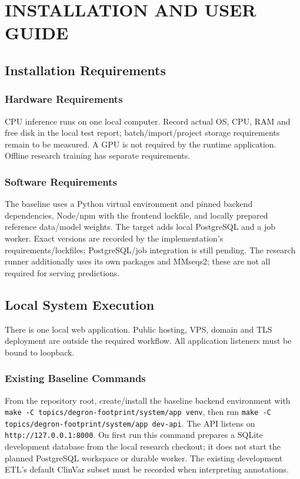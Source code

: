 \chapter{INSTALLATION AND USER GUIDE}\label{app:installation}

\section{Installation Requirements}
\subsection{Hardware Requirements}
CPU inference runs on one local computer. Record actual OS, CPU, RAM and free disk in the local test
report; batch/import/project storage requirements remain to be measured. A GPU is not required by the
runtime application. Offline research training has separate requirements.
\subsection{Software Requirements}
The baseline uses a Python virtual environment and pinned backend dependencies, Node/npm with the
frontend lockfile, and locally prepared reference data/model weights. The target adds local PostgreSQL
and a job worker. Exact versions are recorded by the implementation's requirements/lockfiles;
PostgreSQL/job integration is still pending. The research runner additionally uses its own packages
and MMseqs2; these are not all required for serving predictions.

\section{Local System Execution}
There is one local web application. Public hosting, VPS, domain and TLS deployment are outside the
required workflow. All application listeners must be bound to loopback.

\subsection{Existing Baseline Commands}
From the repository root, create/install the baseline backend environment with
\nolinkurl{make -C topics/degron-footprint/system/app venv}, then run
\nolinkurl{make -C topics/degron-footprint/system/app dev-api}.
The API listens on \nolinkurl{http://127.0.0.1:8000}. On first run this command prepares a SQLite
development database from the local research checkout; it does not start the planned PostgreSQL
workspace or durable worker. The existing development ETL's default ClinVar subset must be recorded
when interpreting annotations.

